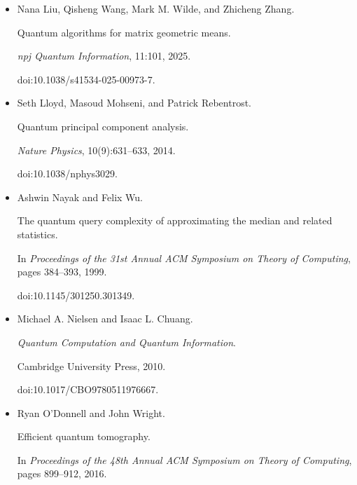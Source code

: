 \begin{itemize}
\emph{Computational Complexity}, 2026.


doi:10.1007/s00037-025-00284-5.





\item[] 
[30]

Nana Liu, Qisheng Wang, Mark M. Wilde, and Zhicheng Zhang.


Quantum algorithms for matrix geometric means.


\emph{npj Quantum Information}, 11:101, 2025.


doi:10.1038/s41534-025-00973-7.





\item[] 
[31]

Seth Lloyd, Masoud Mohseni, and Patrick Rebentrost.


Quantum principal component analysis.


\emph{Nature Physics}, 10(9):631–633, 2014.


doi:10.1038/nphys3029.





\item[] 
[32]

Ashwin Nayak and Felix Wu.


The quantum query complexity of approximating the median and related
statistics.


In \emph{Proceedings of the 31st Annual ACM Symposium on Theory of
Computing}, pages 384–393, 1999.


doi:10.1145/301250.301349.





\item[] 
[33]

Michael A. Nielsen and Isaac L. Chuang.


\emph{Quantum Computation and Quantum Information}.


Cambridge University Press, 2010.


doi:10.1017/CBO9780511976667.





\item[] 
[34]

Ryan O’Donnell and John Wright.


Efficient quantum tomography.


In \emph{Proceedings of the 48th Annual ACM Symposium on Theory of
Computing}, pages 899–912, 2016.



\end{itemize}
